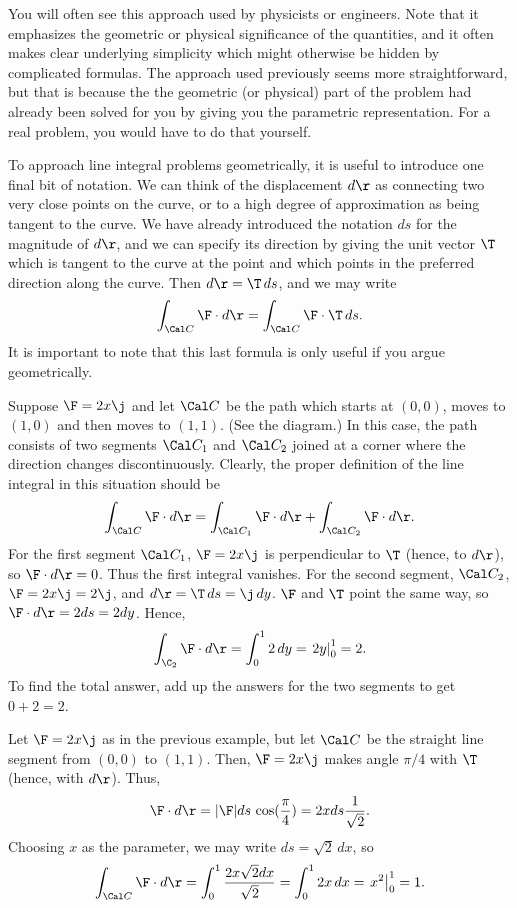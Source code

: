You will often see this approach used by physicists or engineers. 
 Note that
it emphasizes the geometric or physical significance of the
quantities, and it often makes clear underlying simplicity
 which might otherwise be hidden by complicated
formulas.   The approach used previously seems more straightforward,
but that is because the the geometric (or physical) part of the problem
had already been solved for you by giving you the
parametric representation.  For a real problem, you would have to
do that yourself.

To approach line integral problems geometrically, it is useful
to introduce one final bit of notation.  We can think
of the displacement $d\r$ as connecting two very close points on
the curve, or to a high degree of approximation as being tangent
to the curve.  We have already introduced the notation $ds$
for the magnitude of $d\r$, and we can specify its direction by
giving the unit vector $\T$ which is tangent to the curve at the
point and which points in the preferred direction along the curve.
Then $d\r = \T\,ds$, and we may write
$$
   \int_{\Cal C} \F\cdot d\r = \int_{\Cal C}\F\cdot \T\, ds.
$$  
It is important to note that this last formula is only useful
if you argue geometrically.

\nextex
{}
Suppose $\F = 2x\j$ and let $\Cal C$ be the path which starts at
$(0,0)$, moves to $(1,0)$ and then moves to $(1,1)$.   (See
the diagram.)  In this case, the path consists of two segments
$\Cal C_1$ and $\Cal C_2$ joined at a corner where the direction
changes discontinuously.  Clearly, the proper definition of
the line integral in this situation should be
$$
   \int_{\Cal C}\F\cdot d\r = 
   \int_{\Cal C_1}\F\cdot d\r + 
   \int_{\Cal C_2}\F\cdot d\r. 
$$
For the first segment $\Cal C_1$, $\F = 2x\j$ is perpendicular to
$\T$ (hence, to $d\r$), so $\F\cdot d\r = 0$.   Thus the first
integral vanishes.   For the second segment, $\Cal C_2$, 
$\F = 2x\j = 2\j$, and $d\r = \T\, ds = \j\,dy$.  $\F$ and $\T$
point the same way, so $\F\cdot d\r = 2 ds = 2 dy$.   Hence,
$$
   \int_{\C_2}\F\cdot d\r = \int_0^1 2\, dy = \left. 2y\right\vert_0^1
                = 2.
$$
To find the total answer, add up the answers for the two segments to
get $0 + 2 = 2$.
\endexample
\centerline{}
\medskip
\nextex
{}
Let $\F = 2x\j$ as in the previous example, but let $\Cal C$ be the
straight line segment from $(0,0)$ to $(1,1)$.   Then, $\F = 2x\j$
makes angle $\pi/4$ with $\T$ (hence, with $d\r$).  Thus,
$$\F\cdot d\r = |\F|ds\, \cos(\frac\pi 4) = 2x ds\frac 1{\sqrt 2}.$$
Choosing $x$ as the parameter, we may write $ds = \sqrt 2 \, dx$,
so
$$
 \int_{\Cal C}\F\cdot d\r = \int_0^1 \frac{2x\sqrt 2 dx}{\sqrt 2}
                   = \int_0^1 2x\,dx = \left. x^2\right\vert_0^1 = 1.
$$

